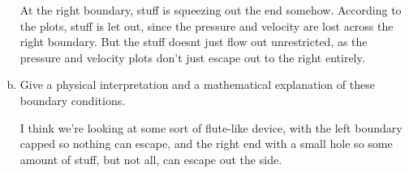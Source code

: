 \documentclass[12pt]{article}
\begin{document}
\begin{enumerate}[(a)]
At the right boundary, stuff is squeezing out the end somehow.  According to the plots, stuff is let out, since the pressure and velocity are lost across the right boundary.  But the stuff doesnt just flow out unrestricted, as the pressure and velocity plots don't just escape out to the right entirely.

\item Give a physical interpretation and a mathematical explanation of these boundary conditions.

I think we're looking at some sort of flute-like device, with the left boundary capped so nothing can escape, and the right end with a small hole so some amount of stuff, but not all, can escape out the side. 
\end{enumerate}
\newpage

\end{document}
